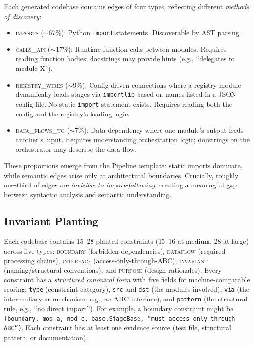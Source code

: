 \documentclass{article}
\begin{document}
Each generated codebase contains edges of four types, reflecting different \emph{methods of discovery}:
\begin{itemize}[nosep]
    \item \textsc{imports} ($\sim$67\%): Python \texttt{import} statements. Discoverable by AST parsing.
    \item \textsc{calls\_api} ($\sim$17\%): Runtime function calls between modules. Requires reading function bodies; docstrings may provide hints (e.g., ``delegates to module X'').
    \item \textsc{registry\_wires} ($\sim$9\%): Config-driven connections where a registry module dynamically loads stages via \texttt{importlib} based on names listed in a JSON config file. No static \texttt{import} statement exists. Requires reading both the config and the registry's loading logic.
    \item \textsc{data\_flows\_to} ($\sim$7\%): Data dependency where one module's output feeds another's input. Requires understanding orchestration logic; docstrings on the orchestrator may describe the data flow.
\end{itemize}

These proportions emerge from the Pipeline template: static imports dominate, while semantic edges arise only at architectural boundaries. Crucially, roughly one-third of edges are \emph{invisible to import-following}, creating a meaningful gap between syntactic analysis and semantic understanding.

\subsection{Invariant Planting}

Each codebase contains 15--28 planted constraints (15--16 at medium, 28 at large) across five types: \textsc{boundary} (forbidden dependencies), \textsc{dataflow} (required processing chains), \textsc{interface} (access-only-through-ABC), \textsc{invariant} (naming/structural conventions), and \textsc{purpose} (design rationales). Every constraint has a \emph{structured canonical form} with five fields for machine-comparable scoring: \texttt{type} (constraint category), \texttt{src} and \texttt{dst} (the modules involved), \texttt{via} (the intermediary or mechanism, e.g., an ABC interface), and \texttt{pattern} (the structural rule, e.g., ``no direct import''). For example, a boundary constraint might be \texttt{(boundary, mod\_a, mod\_c, base.StageBase, ``must access only through ABC'')}. Each constraint has at least one evidence source (test file, structural pattern, or documentation).
\end{document}
